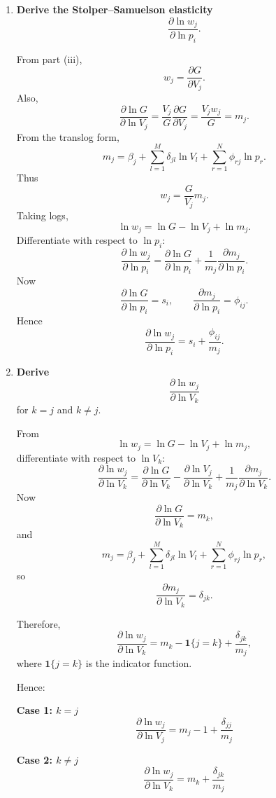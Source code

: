 \begin{enumerate}
\bigskip

\item[(vi)] \textbf{Derive the Stolper--Samuelson elasticity}
\[
\frac{\partial \ln w_j}{\partial \ln p_i}.
\]

From part (iii),
\[
w_j=\frac{\partial G}{\partial V_j}.
\]
Also,
\[
\frac{\partial \ln G}{\partial \ln V_j}
=
\frac{V_j}{G}\frac{\partial G}{\partial V_j}
=
\frac{V_j w_j}{G}
=
m_j.
\]
From the translog form,
\[
m_j
=
\beta_j+\sum_{l=1}^M \delta_{jl}\ln V_l+\sum_{r=1}^N \phi_{rj}\ln p_r.
\]
Thus
\[
w_j=\frac{G}{V_j}m_j.
\]
Taking logs,
\[
\ln w_j=\ln G-\ln V_j+\ln m_j.
\]
Differentiate with respect to $\ln p_i$:
\[
\frac{\partial \ln w_j}{\partial \ln p_i}
=
\frac{\partial \ln G}{\partial \ln p_i}
+
\frac{1}{m_j}\frac{\partial m_j}{\partial \ln p_i}.
\]
Now
\[
\frac{\partial \ln G}{\partial \ln p_i}=s_i,
\qquad
\frac{\partial m_j}{\partial \ln p_i}=\phi_{ij}.
\]
Hence
\[
\boxed{
\frac{\partial \ln w_j}{\partial \ln p_i}
=
s_i+\frac{\phi_{ij}}{m_j}
}.
\]

\bigskip

\item[(vii)] \textbf{Derive}
\[
\frac{\partial \ln w_j}{\partial \ln V_k}
\]
for $k=j$ and $k\neq j$.

From
\[
\ln w_j=\ln G-\ln V_j+\ln m_j,
\]
differentiate with respect to $\ln V_k$:
\[
\frac{\partial \ln w_j}{\partial \ln V_k}
=
\frac{\partial \ln G}{\partial \ln V_k}
-
\frac{\partial \ln V_j}{\partial \ln V_k}
+
\frac{1}{m_j}\frac{\partial m_j}{\partial \ln V_k}.
\]
Now
\[
\frac{\partial \ln G}{\partial \ln V_k}=m_k,
\]
and
\[
m_j
=
\beta_j+\sum_{l=1}^M \delta_{jl}\ln V_l+\sum_{r=1}^N \phi_{rj}\ln p_r,
\]
so
\[
\frac{\partial m_j}{\partial \ln V_k}=\delta_{jk}.
\]

Therefore,
\[
\frac{\partial \ln w_j}{\partial \ln V_k}
=
m_k-\mathbf{1}\{j=k\}+\frac{\delta_{jk}}{m_j},
\]
where $\mathbf{1}\{j=k\}$ is the indicator function.

Hence:

\medskip

\textbf{Case 1: $k=j$}
\[
\boxed{
\frac{\partial \ln w_j}{\partial \ln V_j}
=
m_j-1+\frac{\delta_{jj}}{m_j}
}
\]

\medskip

\textbf{Case 2: $k\neq j$}
\[
\boxed{
\frac{\partial \ln w_j}{\partial \ln V_k}
=
m_k+\frac{\delta_{jk}}{m_j}
}
\]

\end{enumerate}